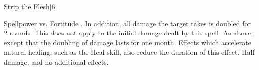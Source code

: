 \begin{spellsection}{Strip the Flesh}[6]
    \begin{spellheader}
    \end{spellheader}
    \begin{spellcontent}
        \begin{spelltargetinginfo}
        \end{spelltargetinginfo}
        \begin{spelleffects}
            \begin{spellattack}{Spellpower vs. Fortitude}
                \spellsuccess {}. In addition, all damage the target takes is doubled for 2 rounds.
                This does not apply to the initial damage dealt by this spell.
                \spellcritical As above, except that the doubling of damage lasts for one month.
                Effects which accelerate natural healing, such as the Heal skill, also reduce the duration of this effect.
                \spellfailure Half damage, and no additional effects.
            \end{spellattack}
        \end{spelleffects}
    \end{spellcontent}
    \begin{spellfooter}
        \spellnotes \physicalspellnotes
        \miscastrandom
    \end{spellfooter}
\end{spellsection}


